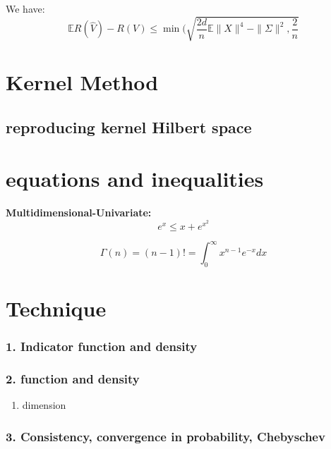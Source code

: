 \begin{theorem}
	We have:
	\begin{equation*}
		\mathbb{E}R(\hat{V}) - R(V) \leq \min (\sqrt{\frac{2d}{n}\mathbb{E}\|X\|^4 - \|\Sigma\|^2, \frac{2}{n} }
	\end{equation*}

\end{theorem}


\section{Kernel Method}
\subsection{reproducing kernel Hilbert space}




\section*{equations and inequalities}
\textbf{Multidimensional-Univariate:}
\begin{equation*}
	e^x \leq x + e^{x^2}
\end{equation*}

\begin{equation*}
	\Gamma(n) = (n - 1)! = \int_0^\infty x^{n -1} e^{-x} dx
\end{equation*}

\section{Technique}

\subsubsection*{1. Indicator function and density}

\subsubsection*{2. function and density}
\begin{enumerate}
	\item dimension
\end{enumerate}

\subsubsection*{3. Consistency, convergence in probability, Chebyschev}

